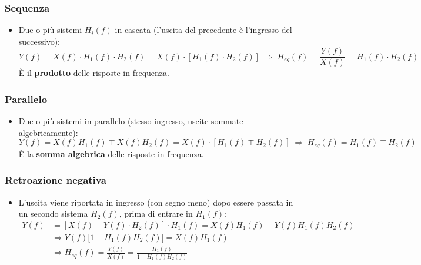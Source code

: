 \documentclass[12pt, a4paper]{article}
\begin{document}
\subsubsection{Sequenza}
\begin{itemize}
    \item Due o più sistemi $H_i(f)$ in cascata (l'uscita del precedente è l'ingresso del successivo):
    $$Y(f) = X(f)\cdot H_1(f)\cdot H_2(f) = X(f)\cdot[H_1(f)\cdot H_2(f)] \;\Longrightarrow\; H_{eq}(f) = \frac{Y(f)}{X(f)} = H_1(f)\cdot H_2(f)$$
    È il \textbf{prodotto} delle risposte in frequenza.
\end{itemize}

\subsubsection{Parallelo}
\begin{itemize}
    \item Due o più sistemi in parallelo (stesso ingresso, uscite sommate algebricamente):
    $$Y(f) = X(f)H_1(f) \mp X(f)H_2(f) = X(f)\cdot[H_1(f)\mp H_2(f)] \;\Longrightarrow\; H_{eq}(f) = H_1(f)\mp H_2(f)$$
    È la \textbf{somma algebrica} delle risposte in frequenza.
\end{itemize}

\subsubsection{Retroazione negativa}
\begin{itemize}
    \item L'uscita viene riportata in ingresso (con segno meno) dopo essere passata in un secondo sistema $H_2(f)$, prima di entrare in $H_1(f)$:
    \begin{align*}
        Y(f) &= [X(f) - Y(f)\cdot H_2(f)]\cdot H_1(f) = X(f)H_1(f) - Y(f)H_1(f)H_2(f) \\
        &\Longrightarrow Y(f)\big[1+H_1(f)H_2(f)\big] = X(f)H_1(f) \\
        &\Longrightarrow H_{eq}(f) = \frac{Y(f)}{X(f)} = \frac{H_1(f)}{1+H_1(f)H_2(f)}
    \end{align*}
\end{itemize}
\end{document}
